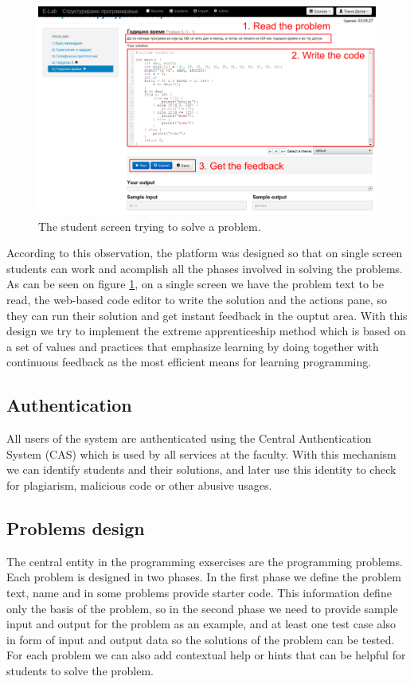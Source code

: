 \documentclass{article}
\begin{document}
\begin{figure}
\centering
\includegraphics[width=.99\textwidth]{e-lab/user_screen}
\caption{The student screen trying to solve a problem.}
\label{fig:student_screen}
\end{figure}

According to this observation, the platform was designed so that on single
screen students can work and acomplish all the phases involved in solving the
problems. As can be seen on figure \ref{fig:student_screen}, on a single screen
we have the problem text to be read, the web-based code editor to write the
solution and the actions pane, so they can run their solution and get instant
feedback in the ouptut area. With this design we try to implement the extreme
apprenticeship method \cite{vihavainen2011extreme} which is based on a set of
values and practices that emphasize learning by doing together with continuous
feedback as the most efficient means for learning programming.

\subsection{Authentication}
All users of the system are authenticated using the Central Authentication
System (CAS) which is used by all services at the faculty. With this mechanism
we can identify students and their solutions, and later use this identity to
check for plagiarism, malicious code or other abusive usages. 

\subsection{Problems design}
The central entity in the programming exsercises are the programming problems.
Each problem is designed in two phases. In the first phase we define the problem
text, name and in some problems provide starter code. This information define
only the basis of the problem, so in the second phase we need to provide sample
input and output for the problem as an example, and at least one test case also
in form of input and output data so the solutions of the problem can be tested.
For each problem we can also add contextual help or hints that can be helpful
for students to solve the problem.
\end{document}
